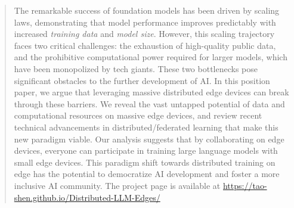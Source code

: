 \begin{abstract}
The remarkable success of foundation models has been driven by scaling laws, demonstrating that model performance improves predictably with increased \textit{training data} and \textit{model size}. 
However, this scaling trajectory faces two critical challenges: the exhaustion of high-quality public data, and the prohibitive computational power required for larger models, which have been monopolized by tech giants. 
These two bottlenecks pose significant obstacles to the further development of AI.
In this position paper, we argue that leveraging massive distributed edge devices can break through these barriers. 
We reveal the vast untapped potential of data and computational resources on massive edge devices, and review recent technical advancements in distributed/federated learning that make this new paradigm viable.
Our analysis suggests that by collaborating on edge devices, everyone can participate in training large language models with small edge devices.
This paradigm shift towards distributed training on edge has the potential to democratize AI development and foster a more inclusive AI community. 
The project page is available at \url{https://tao-shen.github.io/Distributed-LLM-Edges/}
\end{abstract}
